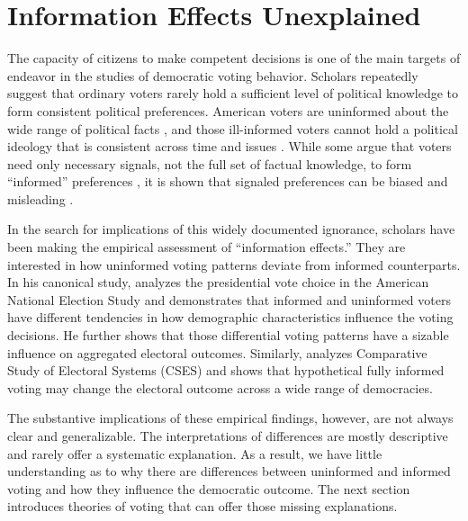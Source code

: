 \documentclass[letterpaper, 12pt]{article}
\begin{document}
    \section*{Information Effects Unexplained}
    
    \par The capacity of citizens to make competent decisions is one of the main targets of endeavor in the studies of democratic voting behavior. Scholars repeatedly suggest that ordinary voters rarely hold a sufficient level of political knowledge to form consistent political preferences. American voters are uninformed about the wide range of political facts \citep{Dellicarpini1996wham}, and those ill-informed voters cannot hold a political ideology that is consistent across time and issues \citep{Converse1964thna, Zaller1992thna, Broockman2016apto}. While some argue that voters need only necessary signals, not the full set of factual knowledge, to form ``informed'' preferences \citep[e.g.,][]{Lupia1994shve}, it is shown that signaled preferences can be biased and misleading \citep{Kuklinski2000mian, Fowler2014thpo, Boudreau2015loin}.

    \par In the search for implications of this widely documented ignorance, scholars have been making the empirical assessment of ``information effects.'' They are interested in how uninformed voting patterns deviate from informed counterparts. In his canonical study, \cite{Bartels1996unvo} analyzes the presidential vote choice in the American National Election Study and demonstrates that informed and uninformed voters have different tendencies in how demographic characteristics influence the voting decisions. He further shows that those differential voting patterns have a sizable influence on aggregated electoral outcomes. Similarly, \cite{Arnold2012thel} analyzes Comparative Study of Electoral Systems (CSES) and shows that hypothetical fully informed voting may change the electoral outcome across a wide range of democracies. 
    
    \par The substantive implications of these empirical findings, however, are not always clear and generalizable. The interpretations of differences are mostly descriptive and rarely offer a systematic explanation. As a result, we have little understanding as to why there are differences between uninformed and informed voting and how they influence the democratic outcome. The next section introduces theories of voting that can offer those missing explanations. %
    
\end{document}
